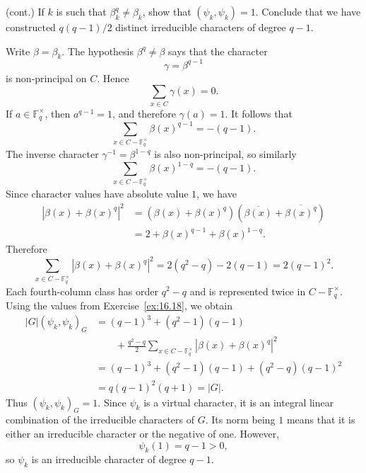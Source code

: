 \documentclass[../Odyssey_Project.tex]{subfiles}
\begin{document}
\begin{exercise}
\label{ex:16.19}
(cont.) If $k$ is such that $\beta_k^q \neq \beta_k$, show that $(\psi_k, \psi_k) = 1$. Conclude that we have constructed $q(q - 1)/2$ distinct irreducible characters of degree $q - 1$.
\end{exercise}
\begin{solution}
    Write $\beta=\beta_k$. The hypothesis $\beta^q\neq\beta$ says that the character
    \[
        \gamma=\beta^{q-1}
    \]
    is non-principal on $C$. Hence
    \[
        \sum_{x\in C}\gamma(x)=0.
    \]
    If $a\in\mathbb{F}_q^\times$, then $a^{q-1}=1$, and therefore $\gamma(a)=1$. It follows that
    \[
        \sum_{x\in C-\mathbb{F}_q^\times}\beta(x)^{q-1}
        =
        -(q-1).
    \]
    The inverse character $\gamma^{-1}=\beta^{1-q}$ is also non-principal, so similarly
    \[
        \sum_{x\in C-\mathbb{F}_q^\times}\beta(x)^{1-q}
        =
        -(q-1).
    \]
    Since character values have absolute value $1$, we have
    \begin{align*}
        \left|\beta(x)+\beta(x)^q\right|^2
        &=
        \left(\beta(x)+\beta(x)^q\right)
        \left(\overline{\beta(x)}+\overline{\beta(x)^q}\right) \\
        &=
        2+\beta(x)^{q-1}+\beta(x)^{1-q}.
    \end{align*}
    Therefore
    \[
        \sum_{x\in C-\mathbb{F}_q^\times}
        \left|\beta(x)+\beta(x)^q\right|^2
        =
        2(q^2-q)-2(q-1)
        =
        2(q-1)^2.
    \]
    Each fourth-column class has order $q^2-q$ and is represented twice in $C-\mathbb{F}_q^\times$. Using the values from Exercise~\ref{ex:16.18}, we obtain
    \begin{align*}
        |G|(\psi_k,\psi_k)_G
        &=
        (q-1)^3
        +(q^2-1)(q-1) \\
        &\qquad
        +\frac{q^2-q}{2}
        \sum_{x\in C-\mathbb{F}_q^\times}
        \left|\beta(x)+\beta(x)^q\right|^2 \\
        &=
        (q-1)^3
        +(q^2-1)(q-1)
        +(q^2-q)(q-1)^2 \\
        &=
        q(q-1)^2(q+1)
        =
        |G|.
    \end{align*}
    Thus $(\psi_k,\psi_k)_G=1$. Since $\psi_k$ is a virtual character, it is an integral linear combination of the irreducible characters of $G$. Its norm being $1$ means that it is either an irreducible character or the negative of one. However,
    \[
        \psi_k(1)=q-1>0,
    \]
    so $\psi_k$ is an irreducible character of degree $q-1$.\\

\end{solution}
\end{document}
